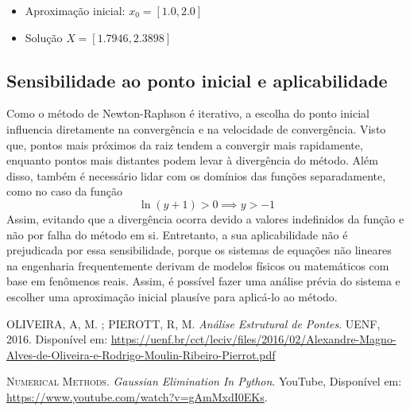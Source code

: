 \documentclass{article}
\begin{document}
\begin{itemize}
\item Aproximação inicial: $x_0 = [1.0, 2.0]$
\item Solução $X =[1.7946, 2.3898]$
\end{itemize}
\subsection*{Sensibilidade ao ponto inicial e aplicabilidade}
Como o método de Newton-Raphson é iterativo, a escolha do ponto inicial influencia diretamente na convergência e na velocidade de convergência. Visto que, pontos mais próximos da raiz tendem a convergir mais rapidamente, 
enquanto pontos mais distantes podem levar à divergência do método.
Além disso, também é necessário lidar com os domínios das funções separadamente, como no caso da função \begin{equation*}\ln(y+1) > 0 \implies y > -1\end{equation*} 
Assim, evitando que a divergência ocorra devido a valores indefinidos da função e não por falha do método em si. Entretanto, a sua aplicabilidade não é prejudicada por essa sensibilidade, porque os sistemas de equações não lineares na engenharia 
frequentemente derivam de modelos físicos ou matemáticos com base em fenômenos reais. Assim, é possível fazer uma análise prévia do sistema e escolher uma aproximação inicial plausíve para aplicá-lo ao método.


\begin{thebibliography}{9}
OLIVEIRA, A, M. ; PIEROTT, R, M.
\textit{Análise Estrutural de Pontes}. 
UENF, 2016. Disponível em: \url{https://uenf.br/cct/leciv/files/2016/02/Alexandre-Magno-Alves-de-Oliveira-e-Rodrigo-Moulin-Ribeiro-Pierrot.pdf}

\textsc{Numerical Methods}. \textit{Gaussian Elimination In Python}. YouTube, Disponível em: \url{https://www.youtube.com/watch?v=gAmMxdI0EKs}.

\end{thebibliography}
\end{document}
